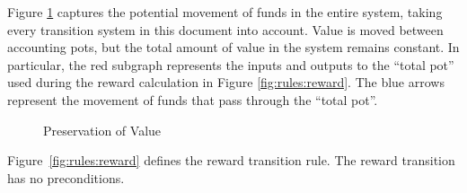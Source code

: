 Figure \ref{fig:fund-preservation} captures the potential movement of funds in the entire system,
taking every transition system in this document into account.  Value is moved between
accounting pots, but the total amount of value in the system remains constant.
In particular, the red subgraph represents the inputs and outputs to
the ``total pot'' used during the reward calculation in Figure \ref{fig:rules:reward}.
The blue arrows represent the movement of funds that pass through the ``total pot''.

\begin{figure}[htb]
  \begin{center}
  \end{center}
  \caption{Preservation of Value}
  \label{fig:fund-preservation}
\end{figure}

Figure~\ref{fig:rules:reward} defines the reward transition rule.
The reward transition has no preconditions.

